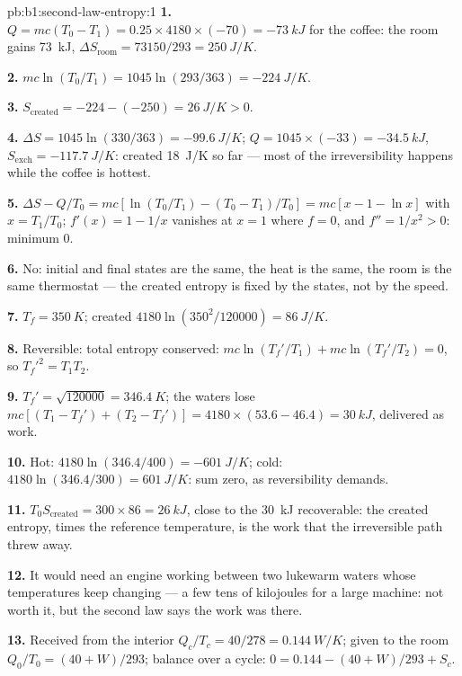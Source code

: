 \begin{solution}{pb:b1:second-law-entropy:1}
\textbf{1.} $Q = mc(T_0 - T_1) = 0.25 \times 4180 \times (-70) = \qty{-73}{kJ}$
for the coffee: the room gains \qty{73}{kJ}, $\Delta S_{\text{room}} = 73150/293
= \qty{+250}{J/K}$.

\textbf{2.} $mc\ln(T_0/T_1) = 1045\ln(293/363) = \qty{-224}{J/K}$.

\textbf{3.} $S_{\mathrm{created}} = -224 - (-250) = \qty{+26}{J/K} > 0$.

\textbf{4.} $\Delta S = 1045\ln(330/363) = \qty{-99.6}{J/K}$; $Q = 1045 \times
(-33) = \qty{-34.5}{kJ}$, $S_{\mathrm{exch}} = \qty{-117.7}{J/K}$: created
\qty{18}{J/K} so far --- most of the irreversibility happens while the
coffee is hottest.

\textbf{5.} $\Delta S - Q/T_0 = mc[\ln(T_0/T_1) - (T_0 - T_1)/T_0] = mc[x - 1 -
\ln x]$ with $x = T_1/T_0$; $f'(x) = 1 - 1/x$ vanishes at $x = 1$ where
$f = 0$, and $f'' = 1/x^2 > 0$: minimum $0$.

\textbf{6.} No: initial and final states are the same, the heat is the
same, the room is the same thermostat --- the created entropy is fixed by
the states, not by the speed.

\textbf{7.} $T_f = \qty{350}{K}$; created $4180\ln(350^2/120000) = \qty{86}{J/K}$.

\textbf{8.} Reversible: total entropy conserved: $mc\ln(T_f'/T_1) + mc\ln(T_f'/
T_2) = 0$, so $T_f'^2 = T_1T_2$.

\textbf{9.} $T_f' = \sqrt{120000} = \qty{346.4}{K}$; the waters lose $mc[(T_1 -
T_f') + (T_2 - T_f')] = 4180 \times (53.6 - 46.4) = \qty{30}{kJ}$, delivered as
work.

\textbf{10.} Hot: $4180\ln(346.4/400) = \qty{-601}{J/K}$; cold: $4180\ln(346.4/
300) = \qty{+601}{J/K}$: sum zero, as reversibility demands.

\textbf{11.} $T_0S_{\mathrm{created}} = 300 \times 86 = \qty{26}{kJ}$, close to the
\qty{30}{kJ} recoverable: the created entropy, times the reference
temperature, is the work that the irreversible path threw away.

\textbf{12.} It would need an engine working between two lukewarm
waters whose temperatures keep changing --- a few tens of kilojoules for
a large machine: not worth it, but the second law says the work was
there.

\textbf{13.} Received from the interior $Q_c/T_c = 40/278 = \qty{0.144}{W/K}$;
given to the room $Q_0/T_0 = (40 + W)/293$; balance over a cycle:
$0 = 0.144 - (40 + W)/293 + S_c$.


\end{solution}
